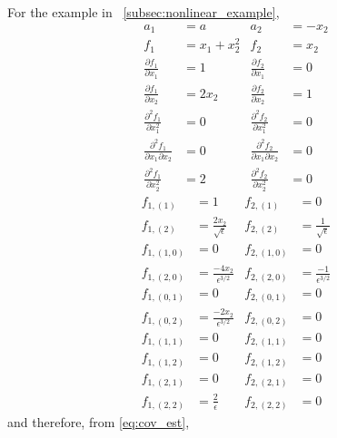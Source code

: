 For the example in \sec~\ref{subsec:nonlinear_example},
\begin{equation}
\begin{aligned}
a_1 &= a
&
a_2 &= -x_2
\\
f_1 &= x_1 + x_2^2
&
f_2 &= x_2
\\
\frac{\partial f_1}{\partial x_1} &= 1
&
\frac{\partial f_2}{\partial x_1} &= 0
\\
\frac{\partial f_1}{\partial x_2} &= 2 x_2
&
\frac{\partial f_2}{\partial x_2} &= 1
\\
\frac{\partial^2 f_1}{\partial x_1^2} &= 0
&
\frac{\partial^2 f_2}{\partial x_1^2} &= 0
\\
\frac{\partial^2 f_1}{\partial x_1 \partial x_2} &= 0
&
\frac{\partial^2 f_2}{\partial x_1 \partial x_2} &= 0
\\
\frac{\partial^2 f_1}{\partial x_2^2 } &= 2
&
\frac{\partial^2 f_2}{\partial x_2^2} &= 0
\end{aligned}
\end{equation}
%
\begin{equation}
\begin{aligned}
f_{1,(1)} &= 1
&
f_{2,(1)} &= 0
\\
f_{1,(2)} &= \frac{2 x_2}{\sqrt{\epsilon}}
&
f_{2,(2)} &= \frac{1}{\sqrt{\epsilon}}
\\
f_{1,(1,0)} &= 0
&
f_{2,(1,0)} &= 0
\\
f_{1,(2,0)} &= \frac{-4 x_2}{\epsilon^{3/2}}
&
f_{2,(2,0)} &= \frac{-1}{\epsilon^{3/2}}
\\
f_{1,(0,1)} &= 0
&
f_{2,(0,1)} &= 0
\\
f_{1,(0,2)} &= \frac{-2 x_2}{\epsilon^{3/2}}
&
f_{2,(0,2)} &= 0
\\
f_{1,(1,1)} &= 0
&
f_{2,(1,1)} &= 0
\\
f_{1,(1,2)} &= 0
&
f_{2,(1,2)} &= 0
\\
f_{1,(2,1)} &= 0
&
f_{2,(2,1)} &= 0
\\
f_{1,(2,2)} &= \frac{2}{\epsilon}
&
f_{2,(2,2)} &= 0
\end{aligned}
\end{equation}
%
and therefore, from \eqref{eq:cov_est},
%
